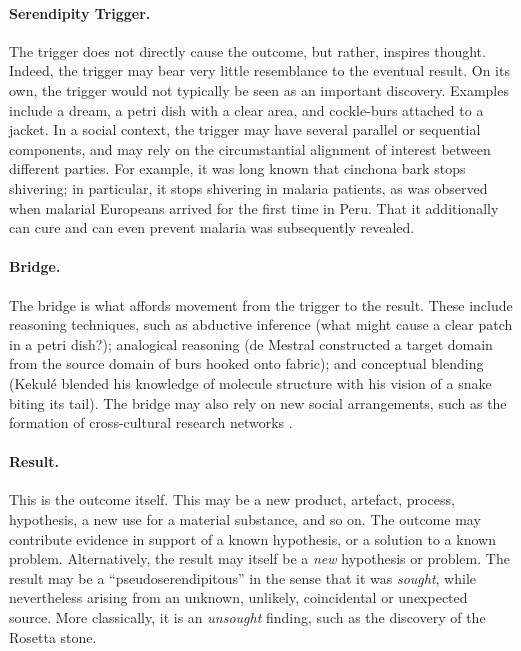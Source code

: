 \documentclass{llncs}
\begin{document}
\paragraph{Serendipity Trigger.}

The trigger does not directly cause the outcome, but rather, inspires
thought.  Indeed, the trigger may bear very little resemblance to the
eventual result.  On its own, the trigger would not typically be seen
as an important discovery.  Examples include a dream, a petri dish
with a clear area, and cockle-burs attached to a jacket.  In a social
context, the trigger may have several parallel or sequential
components, and may rely on the circumstantial alignment of interest
between different parties.  For example, it was long known that
cinchona bark stops shivering; in particular, it stops shivering in
malaria patients, as was observed when malarial Europeans arrived for
the first time in Peru.  That it additionally can cure and can even
prevent malaria was subsequently revealed.

\paragraph{Bridge.}

The bridge is what affords movement from the trigger to the result.
These include reasoning techniques, such as abductive inference (what
might cause a clear patch in a petri dish?); analogical reasoning (de
Mestral constructed a target domain from the source domain of burs
hooked onto fabric); and conceptual blending (Kekul\'e blended his
knowledge of molecule structure with his vision of a snake biting its
tail).  The bridge may also rely on new social arrangements, such as
the formation of cross-cultural research networks
\cite{companions-in-geography}.

\paragraph{Result.}

This is the outcome itself. This may be a new product, artefact,
process, hypothesis, a new use for a material substance, and so on.
The outcome may contribute evidence in support of a known hypothesis,
or a solution to a known problem.  Alternatively, the result may
itself be a {\em new} hypothesis or problem.  The result may be a
``pseudoserendipitous'' in the sense that it was {\em sought}, while
nevertheless arising from an unknown, unlikely, coincidental or
unexpected source.  More classically, it is an \emph{unsought}
finding, such as the discovery of the Rosetta stone.
\end{document}

